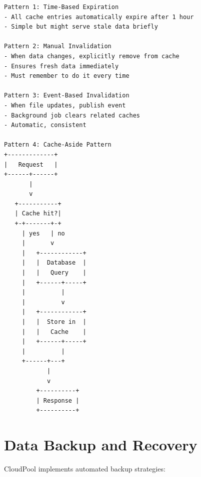 \documentclass[11pt,a4paper]{report}
\begin{document}
\begin{lstlisting}[language=text]
Pattern 1: Time-Based Expiration
- All cache entries automatically expire after 1 hour
- Simple but might serve stale data briefly

Pattern 2: Manual Invalidation
- When data changes, explicitly remove from cache
- Ensures fresh data immediately
- Must remember to do it every time

Pattern 3: Event-Based Invalidation
- When file updates, publish event
- Background job clears related caches
- Automatic, consistent

Pattern 4: Cache-Aside Pattern
+-------------+
|   Request   |
+------+------+
       |
       v
   +-----------+
   | Cache hit?|
   +-+-------+-+
     | yes   | no
     |       v
     |   +------------+
     |   |  Database  |
     |   |   Query    |
     |   +------+-----+
     |          |
     |          v
     |   +------------+
     |   |  Store in  |
     |   |   Cache    |
     |   +------+-----+
     |          |
     +------+---+
            |
            v
         +----------+
         | Response |
         +----------+
\end{lstlisting}


\chapter{Data Backup and Recovery}


CloudPool implements automated backup strategies:
\end{document}
